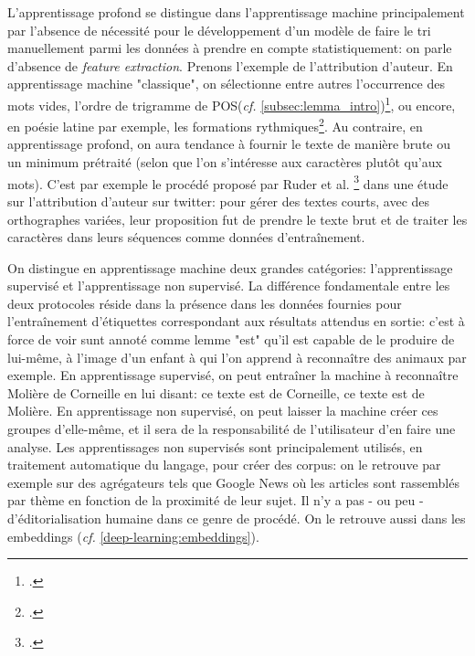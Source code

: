 L'apprentissage profond se distingue dans l'apprentissage machine principalement par l'absence de nécessité pour le développement d'un modèle de faire le tri manuellement parmi les données à prendre en compte statistiquement: on parle d'absence de \textit{feature extraction}. Prenons l'exemple de l'attribution d'auteur. En apprentissage machine "classique", on sélectionne entre autres l'occurrence des mots vides, l'ordre de trigramme de POS(\textit{cf.} \ref{subsec:lemma_intro})\footcite{Cafieroeaax5489}, ou encore, en poésie latine par exemple, les formations rythmiques\footcite{nagy_metre_nodate}. Au contraire, en apprentissage profond, on aura tendance à fournir le texte de manière brute ou un minimum prétraité (selon que l'on s'intéresse aux caractères plutôt qu'aux mots). C'est par exemple le procédé proposé par Ruder et al. \footcite{ruder_character-level_2016} dans une étude sur l'attribution d'auteur sur twitter: pour gérer des textes courts, avec des orthographes variées, leur proposition fut de prendre le texte brut et de traiter les caractères dans leurs séquences comme données d'entraînement.

On distingue en apprentissage machine deux grandes catégories: l'apprentissage supervisé et l'apprentissage non supervisé.  La différence fondamentale entre les deux protocoles réside dans la présence dans les données fournies pour l'entraînement d'étiquettes correspondant aux résultats attendus en sortie: c'est à force de voir sunt annoté comme lemme "est" qu'il est capable de le produire de lui-même, à l'image d'un enfant à qui l'on apprend à reconnaître des animaux par exemple. En apprentissage supervisé, on peut entraîner la machine à reconnaître Molière de Corneille en lui disant: ce texte est de Corneille, ce texte est de Molière. En apprentissage non supervisé, on peut laisser la machine créer ces groupes d'elle-même, et il sera de la responsabilité de l'utilisateur d'en faire une analyse. Les apprentissages non supervisés sont principalement utilisés, en traitement automatique du langage, pour créer des corpus: on le retrouve par exemple sur des agrégateurs tels que Google News où les articles sont rassemblés par thème en fonction de la proximité de leur sujet. Il n'y a pas - ou peu - d'éditorialisation humaine dans ce genre de procédé. On le retrouve aussi dans les embeddings (\textit{cf.} \ref{deep-learning:embeddings}).

